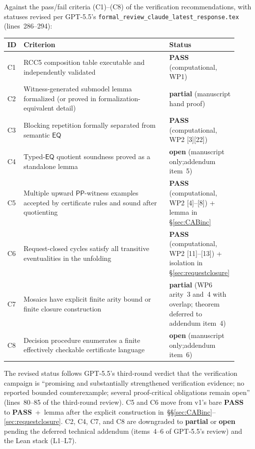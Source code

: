 \documentclass[11pt]{article}
\newcommand{\EQ}{\mathsf{EQ}}
\newcommand{\PP}{\mathsf{PP}}
\newcommand{\PASS}{\textcolor{black!70!green}{\textbf{PASS}}}
\newcommand{\OPEN}{\textcolor{black!60!orange}{\textbf{open}}}
\newcommand{\PARTIAL}{\textcolor{black!60!orange}{\textbf{partial}}}
\begin{document}
Against the pass/fail criteria (C1)--(C8) of the verification
recommendations, with statuses revised per GPT-5.5's
\texttt{formal\_review\_claude\_latest\_response.tex}
(lines~286--294):
\begin{center}\small
\begin{tabular}{p{0.05\linewidth} p{0.62\linewidth} p{0.26\linewidth}}
\toprule
ID & Criterion & Status \\
\midrule
C1 & RCC5 composition table executable and independently validated & \PASS{} (computational, WP1) \\
C2 & Witness-generated submodel lemma formalized
     (or proved in formalization-equivalent detail) & \PARTIAL{} (manuscript hand proof) \\
C3 & Blocking repetition formally separated from semantic \(\EQ\)
     & \PASS{} (computational, WP2 [3][22]) \\
C4 & Typed-\(\EQ\) quotient soundness proved as a standalone lemma
     & \OPEN{} (manuscript only;\@ addendum item~5) \\
C5 & Multiple upward \(\PP\)-witness examples accepted by certificate
     rules and sound after quotienting
     & \PASS{} (computational, WP2 [4]--[8]) +
       lemma in \S\ref{sec:CABinc} \\
C6 & Request-closed cycles satisfy all transitive eventualities in
     the unfolding
     & \PASS{} (computational, WP2 [11]--[13]) +
       isolation in \S\ref{sec:requestclosure} \\
C7 & Mosaics have explicit finite arity bound or finite closure
     construction
     & \PARTIAL{} (WP6 arity~3 and~4 with overlap;
       theorem deferred to addendum item~4) \\
C8 & Decision procedure enumerates a finite effectively checkable
     certificate language
     & \OPEN{} (manuscript only;\@ addendum item~6) \\
\bottomrule
\end{tabular}
\end{center}

\noindent
The revised status follows GPT-5.5's third-round verdict that the
verification campaign is ``promising and substantially strengthened
verification evidence; no reported bounded counterexample;
several proof-critical obligations remain open'' (lines~80--85 of
the third-round review).  C5 and C6 move from v1's bare \PASS{}
to \PASS{}~+~lemma after the explicit construction
in~\S\S\ref{sec:CABinc}--\ref{sec:requestclosure}.  C2, C4, C7,
and C8 are downgraded to \PARTIAL{} or \OPEN{} pending the
deferred technical addendum (items~4--6 of GPT-5.5's review) and
the Lean stack (L1--L7).
\end{document}
